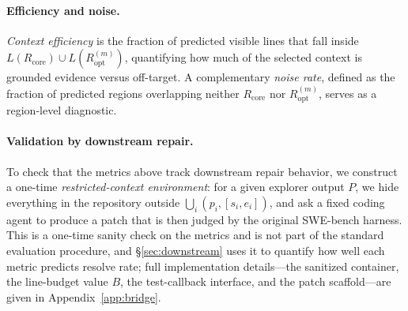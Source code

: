  

\paragraph{Efficiency and noise.}
\emph{Context efficiency} is the fraction of predicted visible lines that fall inside $L(R_{\text{core}}) \cup L(R_{\text{opt}}^{(m)})$, quantifying how much of the selected context is grounded evidence versus off-target. A complementary \emph{noise rate}, defined as the fraction of predicted regions overlapping neither $R_{\text{core}}$ nor $R_{\text{opt}}^{(m)}$, serves as a region-level diagnostic.







 
\paragraph{Validation by downstream repair.}\label{sec:bridge}
To check that the metrics above track downstream repair behavior, we construct a one-time \emph{restricted-context environment}: for a given explorer output $P$, we hide everything in the repository outside $\bigcup_i (p_i, [s_i, e_i])$, and ask a fixed coding agent to produce a patch that is then judged by the original SWE-bench harness. This is a one-time sanity check on the metrics and is not part of the standard evaluation procedure, and \S\ref{sec:downstream} uses it to quantify how well each metric predicts resolve rate; full implementation details---the sanitized container, the line-budget value $B$, the test-callback interface, and the patch scaffold---are given in Appendix~\ref{app:bridge}.













